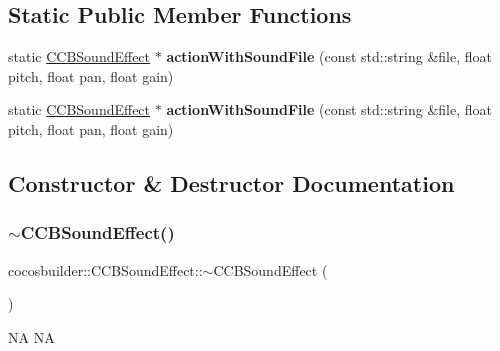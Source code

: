 \subsection*{Static Public Member Functions}
\begin{DoxyCompactItemize}
\item 
\mbox{\label{classcocosbuilder_1_1CCBSoundEffect_a7b7ce15168d9220f875eca0ceb0218a9}} 
static \hyperlink{classcocosbuilder_1_1CCBSoundEffect}{C\+C\+B\+Sound\+Effect} $\ast$ {\bfseries action\+With\+Sound\+File} (const std\+::string \&file, float pitch, float pan, float gain)
\item 
\mbox{\label{classcocosbuilder_1_1CCBSoundEffect_a70d0547e06073b468b7538bd995c66c7}} 
static \hyperlink{classcocosbuilder_1_1CCBSoundEffect}{C\+C\+B\+Sound\+Effect} $\ast$ {\bfseries action\+With\+Sound\+File} (const std\+::string \&file, float pitch, float pan, float gain)
\end{DoxyCompactItemize}


\subsection{Constructor \& Destructor Documentation}
\mbox{\label{classcocosbuilder_1_1CCBSoundEffect_aa7814bf8a50e936adf6354a1a87006ca}} 
\subsubsection{\texorpdfstring{$\sim$\+C\+C\+B\+Sound\+Effect()}{~CCBSoundEffect()}\hspace{0.1cm}{\footnotesize\ttfamily [1/2]}}
{\footnotesize\ttfamily cocosbuilder\+::\+C\+C\+B\+Sound\+Effect\+::$\sim$\+C\+C\+B\+Sound\+Effect (\begin{DoxyParamCaption}{ }\end{DoxyParamCaption})}

NA  NA \mbox{\label{classcocosbuilder_1_1CCBSoundEffect_aa7814bf8a50e936adf6354a1a87006ca}} 
